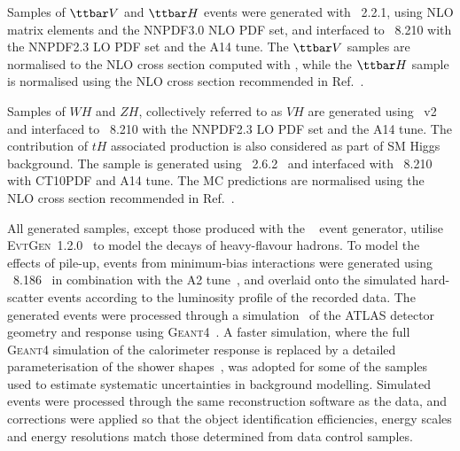 Samples of $\ttbar V$ and $\ttbar H$ events were generated with {\amcatnlo}~2.2.1, using NLO matrix elements and the NNPDF3.0 NLO PDF set,
and interfaced to {\pythia}~8.210 with the NNPDF2.3 LO PDF set and the A14 tune. 
The $\ttbar V$ samples are normalised to the NLO cross section computed with {\amcatnlo}, while the $\ttbar H$ sample is normalised using 
the NLO cross section recommended in Ref.~\cite{deFlorian:2016spz}.

Samples of $WH$ and $ZH$, collectively referred to as $VH$ are generated using {\powheg}~v2 \cite{Frixione:2007nw,Nason:2004rx,Frixione:2007vw,Alioli:2010xd}
and interfaced to {\pythia}~8.210 with the NNPDF2.3 LO PDF set and the A14 tune.
The contribution of $tH$ associated production is also considered as part of SM Higgs background.
The sample is generated using {\amcatnlolong}~2.6.2~\cite{Alwall:2014hca} and interfaced with {\pythia}~8.210 with CT10PDF
and A14 tune. The MC predictions are normalised using the NLO cross section recommended in Ref.~\cite{deFlorian:2016spz}. 

All generated samples, except those produced with the {\sherpa}~\cite{Gleisberg:2008ta} event generator, 
utilise \textsc{EvtGen}~1.2.0~\cite{Lange:2001uf} to model the decays of heavy-flavour hadrons. 
To model the effects of pile-up, events from minimum-bias interactions were generated using {\pythia}~8.186~\cite{Sjostrand:2007gs}  
in combination with the A2 tune~\cite{ATL-PHYS-PUB-2011-014}, 
and overlaid onto the simulated hard-scatter events according to the luminosity profile of the recorded data. 
The generated events were processed through a simulation~\cite{Aad:2010ah} of the ATLAS detector geometry and response 
using \textsc{Geant4}~\cite{Agostinelli:2002hh}. A faster simulation, where the full \textsc{Geant4} simulation of
the calorimeter response is replaced by a detailed parameterisation of the shower shapes~\cite{FastCaloSim},
was adopted for some of the samples used to estimate systematic uncertainties in background modelling.
Simulated events were processed through the same reconstruction software as the data, and corrections were applied so that the object identification 
efficiencies, energy scales and energy resolutions match those determined from data control samples.


